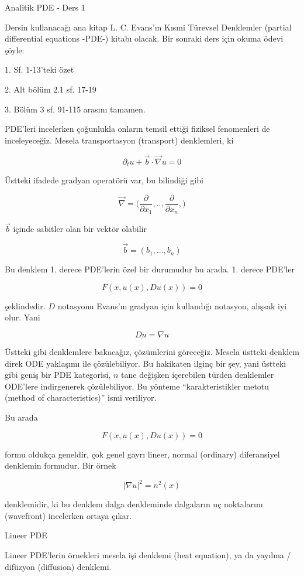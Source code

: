 \documentclass[12pt,fleqn]{article}\usepackage{../../common}
\begin{document}
Analitik PDE - Ders 1

Dersin kullanacağı ana kitap L. C. Evans'ın Kısmi Türevsel Denklemler
(partial differential equations -PDE-) kitabı olacak. Bir sonraki ders için
okuma ödevi şöyle:

1. Sf. 1-13'teki özet

2. Alt bölüm 2.1 sf. 17-19

3. Bölüm 3 sf. 91-115 arasını tamamen. 

PDE'leri incelerken çoğunlukla onların temsil ettiği fiziksel fenomenleri
de inceleyeceğiz. Mesela transportasyon (transport) denklemleri, ki

$$ \partial_t u + \vec{b} \cdot \vec{\nabla} u = 0 $$

Üstteki ifadede gradyan operatörü var, bu bilindiği gibi

$$ \vec{\nabla} = \bigg( 
\frac{\partial }{\partial x_1},.., 
\frac{\partial }{\partial x_n},
\bigg)
$$

$\vec{b}$ içinde sabitler olan bir vektör olabilir

$$ \vec{b} = (b_1,...,b_n)
 $$

Bu denklem 1. derece PDE'lerin özel bir durumudur bu arada. 1. derece
PDE'ler 

$$ F(x, u(x), Du(x)) = 0 $$

şeklindedir. $D$ notasyonu Evans'ın gradyan için kullandığı notasyon,
alışsak iyi olur. Yani

$$ Du = \nabla u $$

Üstteki gibi denklemlere bakacağız, çözümlerini göreceğiz. Mesela üstteki
denklem direk ODE yaklaşımı ile çözülebiliyor. Bu hakikaten ilginç bir şey,
yani üstteki gibi geniş bir PDE kategorisi, $n$ tane değişken içerebilen
türden denklemler ODE'lere indirgenerek çözülebiliyor. Bu yönteme
``karakteristikler metotu (method of characteristics)'' ismi veriliyor.

Bu arada

$$ F(x, u(x), Du(x)) = 0 $$

formu oldukça geneldir, çok genel gayrı lineer, normal (ordinary)
diferansiyel denklemin formudur. Bir örnek

$$ |\nabla u|^2 = n^2(x) $$

denklemidir, ki bu denklem dalga denkleminde dalgaların uç noktalarını
(wavefront) incelerken ortaya çıkar. 

Lineer PDE

Lineer PDE'lerin örnekleri mesela işi denklemi (heat equation), ya da
yayılma / difüzyon (diffusion) denklemi.
\end{document}
